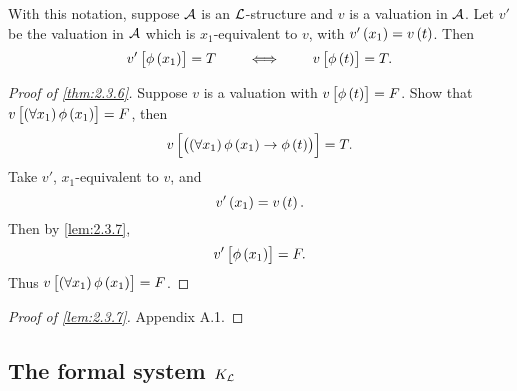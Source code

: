 \begin{lemma}
\label{lem:2.3.7}
With this notation, suppose $ \AA $ is an $ \LL $-structure and $ v $ is a valuation in $ \AA $. Let $ v' $ be the valuation in $ \AA $ which is $ x_1 $-equivalent to $ v $, with $ v'\br{x_1} = v\br{t} $. Then
$$ v'\sbr{\phi\br{x_1}} = T \qquad \iff \qquad v\sbr{\phi\br{t}} = T. $$
\end{lemma}

\begin{proof}[Proof of \ref{thm:2.3.6}]
Suppose $ v $ is a valuation with $ v\sbr{\phi\br{t}} = F $. Show that $ v\sbr{\fab{x_1}\phi\br{x_1}} = F $, then
$$ v\sbr{\impb{\fab{x_1}\phi\br{x_1}}{\phi\br{t}}} = T. $$
Take $ v' $, $ x_1 $-equivalent to $ v $, and
$$ v'\br{x_1} = v\br{t}. $$
Then by \ref{lem:2.3.7},
$$ v'\sbr{\phi\br{x_1}} = F. $$
Thus $ v\sbr{\fab{x_1}\phi\br{x_1}} = F $.
\end{proof}

\begin{proof}[Proof of \ref{lem:2.3.7}]
Appendix A.1.
\end{proof}

\subsection{The formal system $ K_\LL $}

